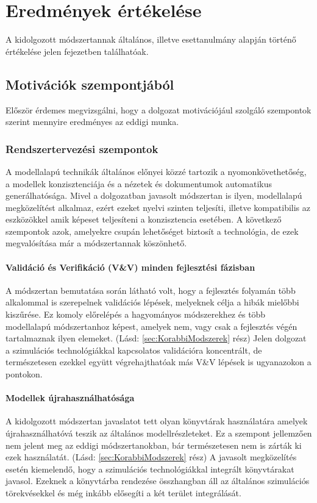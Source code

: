 \chapter{Eredmények értékelése}
A kidolgozott módszertannak általános, illetve esettanulmány alapján történő értékelése jelen fejezetben találhatóak.

    \section{Motivációk szempontjából}
    Először érdemes megvizsgálni, hogy a dolgozat motivációjául szolgáló szempontok szerint mennyire eredményes az eddigi munka.

        \subsection{Rendszertervezési szempontok}
        A modellalapú technikák általános előnyei közzé tartozik a nyomonkövethetőség, a modellek konzisztenciája és a nézetek és dokumentumok automatikus generálhatósága.
        Mivel a dolgozatban javasolt módszertan is ilyen, modellalapú megközelítést alkalmaz, ezért ezeket nyelvi szinten teljesíti, illetve kompatibilis az eszközökkel amik képeset teljesíteni a konzisztencia esetében.
        A következő szempontok azok, amelyekre csupán lehetőséget biztosít a technológia, de ezek megvalósítása már a módszertannak köszönhető.

            \subsubsection{Validáció és Verifikáció (V\&V) minden fejlesztési fázisban} \label{ertekelesVV}
            A módszertan bemutatása során látható volt, hogy a fejlesztés folyamán több alkalommal is szerepelnek validációs lépések, melyeknek célja a hibák mielőbbi kiszűrése.
            Ez komoly előrelépés a hagyományos módszerekhez és több modellalapú módszertanhoz képest, amelyek nem, vagy csak a fejlesztés végén tartalmaznak ilyen elemeket. (Lásd: \ref{sec:KorabbiModszerek} rész)
            Jelen dolgozat a szimulációs technológiákkal kapcsolatos validációra koncentrált, de természetesen ezekkel együtt végrehajthatóak más V\&V lépések is ugyanazokon a pontokon.

            \subsubsection{Modellek újrahasználhatósága}
            A kidolgozott módszertan javaslatot tett olyan könyvtárak használatára amelyek újrahasználhatóvá teszik az általános modellrészleteket.
            Ez a szempont jellemzően nem jelent meg az eddigi módszertanokban, bár természetesen nem is zárták ki ezek használatát. (Lásd: \ref{sec:KorabbiModszerek} rész)
            A javasolt megközelítés esetén kiemelendő, hogy a szimulációs technológiákkal integrált könyvtárakat javasol. Ezeknek a könyvtárba rendezése összhangban áll az általános szimulációs törekvésekkel és még inkább elősegíti a két terület integrálását.


